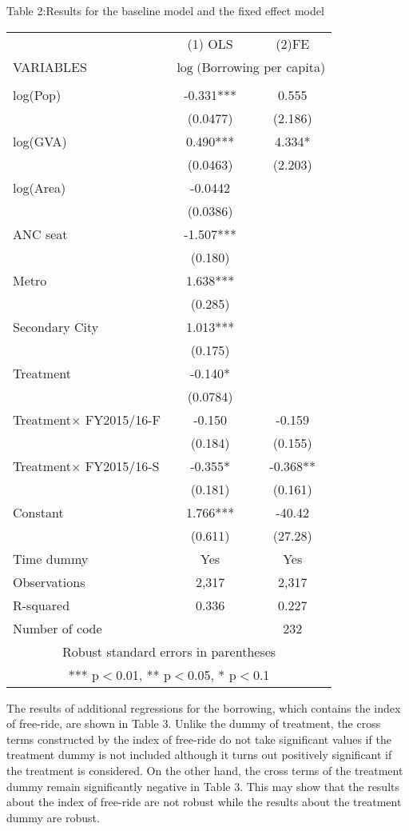\documentclass[dvipdfmx]{jsarticle}
\begin{document}
\begin{center}Table 2:Results for the baseline model and the fixed effect model\\
\scriptsize
\begin{tabular}{lcc} \hline
 & (1) OLS& (2)FE \\
VARIABLES & \multicolumn{2}{c}{$\log($Borrowing per capita)} \\ \hline
 &  &  \\
log(Pop) & -0.331*** & 0.555 \\
 & (0.0477) & (2.186) \\
log(GVA) & 0.490*** & 4.334* \\
 & (0.0463) & (2.203) \\
log(Area) & -0.0442 &  \\
 & (0.0386) &  \\
ANC seat & -1.507*** &  \\
 & (0.180) &  \\
Metro & 1.638*** &  \\
 & (0.285) &  \\
Secondary City & 1.013*** &  \\
 & (0.175) &  \\
Treatment & -0.140* &  \\
 & (0.0784) &  \\
Treatment$\times$ FY2015/16-F& -0.150 & -0.159 \\
 & (0.184) & (0.155) \\
Treatment$\times$ FY2015/16-S & -0.355* & -0.368** \\
 & (0.181) & (0.161) \\
Constant & 1.766*** & -40.42 \\
 & (0.611) & (27.28) \\ \hline
Time dummy &Yes  &Yes  \\
Observations & 2,317 & 2,317 \\
R-squared & 0.336 & 0.227 \\
 Number of code &  & 232 \\ \hline
\multicolumn{3}{c}{ Robust standard errors in parentheses} \\
\multicolumn{3}{c}{ *** p$<$0.01, ** p$<$0.05, * p$<$0.1} \\
\end{tabular}
\end{center}\normalsize
\quad The results of additional regressions for the borrowing, which contains the index of free-ride, are shown in Table 3. Unlike the dummy of treatment, the cross terms constructed by the index of free-ride do not take significant values if the treatment dummy is not included although it turns out positively significant if the treatment is considered. On the other hand, the cross terms of the treatment dummy remain significantly negative in Table 3. This may show that the results about the index of free-ride are not robust while the results about the treatment dummy are robust.\\
\end{document}
